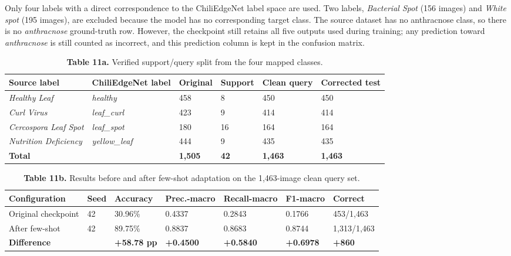 Only four labels with a direct correspondence to the ChiliEdgeNet label space are used. Two labels, \emph{Bacterial Spot} (156 images) and \emph{White spot} (195 images), are excluded because the model has no corresponding target class. The source dataset has no anthracnose class, so there is no \emph{anthracnose} ground-truth row. However, the checkpoint still retains all five outputs used during training; any prediction toward \emph{anthracnose} is still counted as incorrect, and this prediction column is kept in the confusion matrix.

\begin{table}[!tb]
\centering
\caption*{\textbf{Table 11a.} Verified support/query split from the four mapped classes.}
\label{tab:11a}
\footnotesize
\setlength{\tabcolsep}{2.5pt}
\renewcommand{\arraystretch}{1.15}
\begin{tabular}{llllll}
\toprule
\textbf{Source label \cite{nirob2025}} & \textbf{ChiliEdgeNet label} & \textbf{Original} & \textbf{Support} & \textbf{Clean query} & \textbf{Corrected test} \\
\midrule
\emph{Healthy Leaf} & \emph{healthy} & 458 & 8 & 450 & 450 \\
\emph{Curl Virus} & \emph{leaf\_curl} & 423 & 9 & 414 & 414 \\
\emph{Cercospora Leaf Spot} & \emph{leaf\_spot} & 180 & 16 & 164 & 164 \\
\emph{Nutrition Deficiency} & \emph{yellow\_leaf} & 444 & 9 & 435 & 435 \\
\textbf{Total} & & \textbf{1,505} & \textbf{42} & \textbf{1,463} & \textbf{1,463} \\
\bottomrule
\end{tabular}
\end{table}

\begin{table}[!tb]
\centering
\caption*{\textbf{Table 11b.} Results before and after few-shot adaptation on the 1,463-image clean query set.}
\label{tab:11b}
\footnotesize
\setlength{\tabcolsep}{2pt}
\renewcommand{\arraystretch}{1.15}
\begin{tabular}{lllllll}
\toprule
\textbf{Configuration} & \textbf{Seed} & \textbf{Accuracy} & \textbf{Prec.-macro} & \textbf{Recall-macro} & \textbf{F1-macro} & \textbf{Correct} \\
\midrule
Original checkpoint & 42 & 30.96\% & 0.4337 & 0.2843 & 0.1766 & 453/1,463 \\
After few-shot & 42 & 89.75\% & 0.8837 & 0.8683 & 0.8744 & 1,313/1,463 \\
\textbf{Difference} & & \textbf{+58.78 pp} & \textbf{+0.4500} & \textbf{+0.5840} & \textbf{+0.6978} & \textbf{+860} \\
\bottomrule
\end{tabular}
\end{table}

